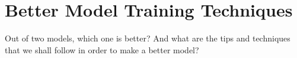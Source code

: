 \chapter{Better Model Training Techniques}

Out of two models, which one is better? And what are the tips and techniques that we shall follow in order to make a better model?








